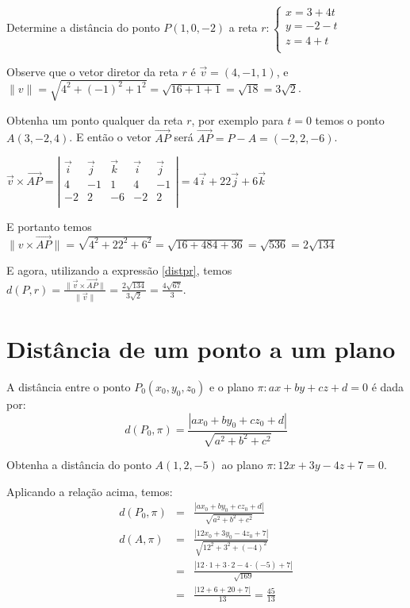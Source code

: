 \begin{exemplo} 
Determine a distância do ponto $P(1, 0, -2)$ a reta $r: \left\{
\begin{array}{l}
x=3+4t \\
y=-2-t \\
z=4+t \\
\end{array} \right.$

Observe que o vetor diretor da reta $r$ é $\vec{v}=(4,-1,1)$, e $\|v\|=\sqrt{4^2+(-1)^2+1^2}=\sqrt{16+1+1}=\sqrt{18}=3\sqrt{2}$.

Obtenha um ponto qualquer da reta $r$, por exemplo para $t=0$ temos o ponto $A(3,-2,4)$. E então o vetor $\overrightarrow{AP}$ será $\overrightarrow{AP}=P-A=(-2,2,-6)$.

$\vec{v} \times \overrightarrow{AP}= \left|
\begin{array}{ccc|cc}
\vec i & \vec j & \vec k & \vec i & \vec j \\
4 & -1 & 1 &4 & -1 \\
-2 & 2 & -6 &-2 & 2 \\
\end{array}
\right|= 4\vec{i} +22\vec{j} +6\vec{k}
$

E portanto temos $\|v \times \overrightarrow{AP}\|=\sqrt{4^2+22^2+6^2}=\sqrt{16+484+36}=\sqrt{536}=2\sqrt{134}$

E agora, utilizando a expressão \ref{distpr}, temos $d(P, r)=\frac{\|\vec{v}\times \overrightarrow{AP}\|}{\|\vec{v}\|}=\frac{2\sqrt{134}}{3\sqrt{2}}=\frac{4\sqrt{67}}{3}$.
\end{exemplo}

\section{Distância de um ponto a um plano}

A distância entre o ponto $P_0(x_0, y_0, z_0)$ e o plano $\pi: ax+by+cz+d=0$ é dada por: 
\begin{equation}
d(P_0, \pi)=\frac{|ax_0+by_0+cz_0+d|}{\sqrt{a^2+b^2+c^2}}
\end{equation}

\begin{exemplo} Obtenha a distância do ponto $A(1, 2, -5)$ ao plano $\pi: 12x+3y-4z+7=0$. 

Aplicando a relação acima, temos:
\begin{eqnarray*}
d(P_0, \pi) & = &\frac{|ax_0+by_0+cz_0+d|}{\sqrt{a^2+b^2+c^2}} \\
d(A, \pi) & = & \frac{|12x_0+3y_0-4z_0+7|}{\sqrt{12^2+3^2+(-4)^2}} \\
          & = &  \frac{|12\cdot 1+3\cdot 2-4\cdot (-5)+7|}{\sqrt{169}} \\
          & = & \frac{|12+6+20+7|}{13}= \frac{45}{13}
\end{eqnarray*}

\end{exemplo}

